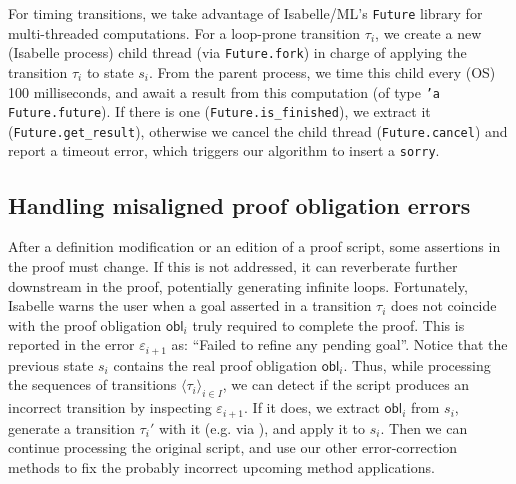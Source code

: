 \documentclass[10pt,conference]{IEEEtran}
\newcommand{\isakw}[1]{{\bfseries\ttfamily\def\isachardot{.}\def\isacharunderscore{\isacharunderscorekeyword}%
\def\isacharbraceleft{\{}\def\isacharbraceright{\}}#1}}
\renewcommand{\isacommand}[1]{\textcolor{IsaBlue}{\isakw{#1}}}
\begin{document}
For timing transitions, we take advantage of Isabelle/ML's \texttt{Future} library for multi-threaded computations. 
For a loop-prone transition $\tau_i$, we create a new (Isabelle process) child thread (via \texttt{Future.fork}) in charge of applying the transition $\tau_i$ to state $s_i$. From the parent process, we time this child every (OS) 100 milliseconds, %
and await a result from this computation (of type \texttt{'a Future.future}). If there is one (\texttt{Future.is\_finished}), we extract it (\texttt{Future.get\_result}), otherwise we cancel the child thread (\texttt{Future.cancel}) and report a timeout error, which triggers our algorithm to insert a \texttt{sorry}.



\subsection{Handling misaligned proof obligation errors}
After a definition modification or an edition of a proof script, some assertions in the proof must change. If this is not addressed, it can reverberate further downstream in the proof, potentially generating infinite loops. Fortunately, Isabelle warns the user when a goal asserted in a transition $\tau_i$ does not coincide with the proof obligation $\mathsf{obl}_i$ truly required to complete the proof. This is reported in the error $\varepsilon_{i+1}$ as: ``Failed to refine any pending goal''. Notice that the previous state $s_i$ contains the real proof obligation $\mathsf{obl}_i$. Thus, while processing the sequences of transitions $\langle \tau_i\rangle_{i\in I}$, we can detect if the script produces an incorrect transition by inspecting $\varepsilon_{i+1}$. If it does, we extract $\mathsf{obl}_i$ from $s_i$, generate a transition $\tau_i'$ with it (e.g. via \isa{\isacommand{show}\ "$\mathsf{obl}_i$"}), and apply it to $s_i$. Then we can continue processing the original script, and use our other error-correction methods to fix the probably incorrect upcoming method applications. 
\end{document}
